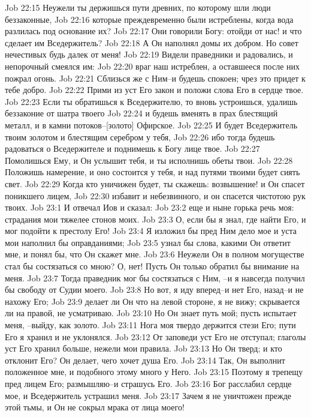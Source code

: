 Job 22:15  Неужели ты держишься пути древних, по которому шли люди беззаконные,
Job 22:16  которые преждевременно были истреблены, когда вода разлилась под основание их?
Job 22:17  Они говорили Богу: отойди от нас! и что сделает им Вседержитель?
Job 22:18  А Он наполнял домы их добром. Но совет нечестивых будь далек от меня!
Job 22:19  Видели праведники и радовались, и непорочный смеялся им:
Job 22:20  враг наш истреблен, а оставшееся после них пожрал огонь.
Job 22:21  Сблизься же с Ним--и будешь спокоен; чрез это придет к тебе добро.
Job 22:22  Прими из уст Его закон и положи слова Его в сердце твое.
Job 22:23  Если ты обратишься к Вседержителю, то вновь устроишься, удалишь беззаконие от шатра твоего
Job 22:24  и будешь вменять в прах блестящий металл, и в камни потоков--[золото] Офирское.
Job 22:25  И будет Вседержитель твоим золотом и блестящим серебром у тебя,
Job 22:26  ибо тогда будешь радоваться о Вседержителе и поднимешь к Богу лице твое.
Job 22:27  Помолишься Ему, и Он услышит тебя, и ты исполнишь обеты твои.
Job 22:28  Положишь намерение, и оно состоится у тебя, и над путями твоими будет сиять свет.
Job 22:29  Когда кто уничижен будет, ты скажешь: возвышение! и Он спасет поникшего лицем,
Job 22:30  избавит и небезвинного, и он спасется чистотою рук твоих.
Job 23:1  И отвечал Иов и сказал:
Job 23:2  еще и ныне горька речь моя: страдания мои тяжелее стонов моих.
Job 23:3  О, если бы я знал, где найти Его, и мог подойти к престолу Его!
Job 23:4  Я изложил бы пред Ним дело мое и уста мои наполнил бы оправданиями;
Job 23:5  узнал бы слова, какими Он ответит мне, и понял бы, что Он скажет мне.
Job 23:6  Неужели Он в полном могуществе стал бы состязаться со мною? О, нет! Пусть Он только обратил бы внимание на меня.
Job 23:7  Тогда праведник мог бы состязаться с Ним, --и я навсегда получил бы свободу от Судии моего.
Job 23:8  Но вот, я иду вперед--и нет Его, назад--и не нахожу Его;
Job 23:9  делает ли Он что на левой стороне, я не вижу; скрывается ли на правой, не усматриваю.
Job 23:10  Но Он знает путь мой; пусть испытает меня, --выйду, как золото.
Job 23:11  Нога моя твердо держится стези Его; пути Его я хранил и не уклонялся.
Job 23:12  От заповеди уст Его не отступал; глаголы уст Его хранил больше, нежели мои правила.
Job 23:13  Но Он тверд; и кто отклонит Его? Он делает, чего хочет душа Его.
Job 23:14  Так, Он выполнит положенное мне, и подобного этому много у Него.
Job 23:15  Поэтому я трепещу пред лицем Его; размышляю--и страшусь Его.
Job 23:16  Бог расслабил сердце мое, и Вседержитель устрашил меня.
Job 23:17  Зачем я не уничтожен прежде этой тьмы, и Он не сокрыл мрака от лица моего!

